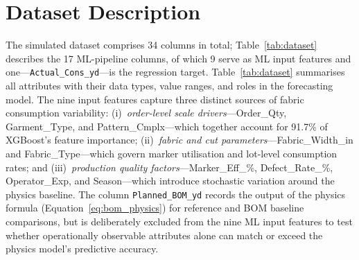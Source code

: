 \secdiv
\section{Dataset Description}
\label{sec:dataset}
The simulated dataset comprises 34 columns in total; Table~\ref{tab:dataset} describes the 17 ML-pipeline columns, of which 9 serve as ML input features and one---\texttt{Actual\_Cons\_yd}---is the regression target. Table~\ref{tab:dataset} summarises all attributes with their data types, value ranges, and roles in the forecasting model. The nine input features capture three distinct sources of fabric consumption variability: (i)~\textit{order-level scale drivers}---Order\_Qty, Garment\_Type, and Pattern\_Cmplx---which together account for 91.7\% of XGBoost's feature importance; (ii)~\textit{fabric and cut parameters}---Fabric\_Width\_in and Fabric\_Type---which govern marker utilisation and lot-level consumption rates; and (iii)~\textit{production quality factors}---Marker\_Eff\_\%, Defect\_Rate\_\%, Operator\_Exp, and Season---which introduce stochastic variation around the physics baseline. The column \texttt{Planned\_BOM\_yd} records the output of the physics formula (Equation~\ref{eq:bom_physics}) for reference and BOM baseline comparisons, but is deliberately excluded from the nine ML input features to test whether operationally observable attributes alone can match or exceed the physics model's predictive accuracy.

